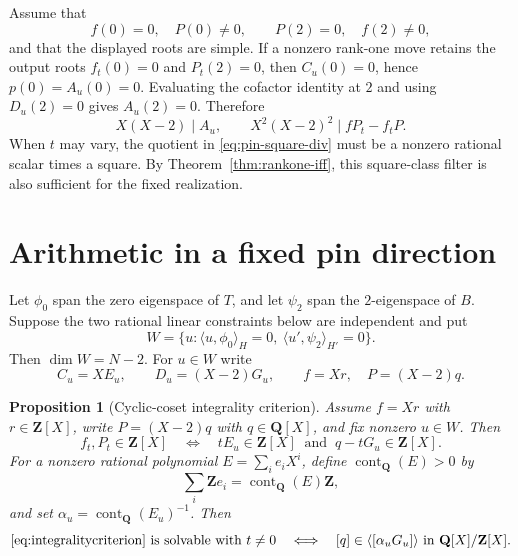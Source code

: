\documentclass[11pt,reqno]{amsart}
\newtheorem{proposition}[theorem]{Proposition}
\theoremstyle{definition}
\theoremstyle{remark}
\DeclareMathOperator{\cont}{cont}
\newcommand{\Q}{\mathbf Q}
\newcommand{\Z}{\mathbf Z}
\begin{document}
Assume that
\begin{equation}\label{eq:pins}
 f(0)=0,\quad P(0)\ne0,\qquad P(2)=0,\quad f(2)\ne0,
\end{equation}
and that the displayed roots are simple.  If a nonzero rank-one move retains
the output roots $f_t(0)=0$ and $P_t(2)=0$, then
$C_u(0)=0$, hence $p(0)=A_u(0)=0$.  Evaluating the cofactor identity at $2$
and using $D_u(2)=0$ gives $A_u(2)=0$.  Therefore
\begin{equation}\label{eq:pin-square-div}
 X(X-2)\mid A_u,\qquad
 X^2(X-2)^2\mid fP_t-f_tP.
\end{equation}
When $t$ may vary, the quotient in \eqref{eq:pin-square-div} must be a
nonzero rational scalar times a square.  By Theorem~\ref{thm:rankone-iff},
this square-class filter is also sufficient for the fixed realization.

\section{Arithmetic in a fixed pin direction}

Let $\phi_0$ span the zero eigenspace of $T$, and let $\psi_2$ span the
$2$-eigenspace of $B$.  Suppose the two rational linear constraints below are
independent and put
\begin{equation}\label{eq:pinspace}
 W=\{u:\langle u,\phi_0\rangle_H=0,
           \ \langle u',\psi_2\rangle_{H'}=0\}.
\end{equation}
Then $\dim W=N-2$.  For $u\in W$ write
\begin{equation}\label{eq:EG}
 C_u=XE_u,\qquad D_u=(X-2)G_u,\qquad
 f=Xr,\quad P=(X-2)q.
\end{equation}

\begin{proposition}[Cyclic-coset integrality criterion]\label{prop:cycliccoset}
Assume $f=Xr$ with $r\in\Z[X]$, write
$P=(X-2)q$ with $q\in\Q[X]$, and fix nonzero $u\in W$.  Then
\begin{equation}\label{eq:integralitycriterion}
 f_t,P_t\in\Z[X]\quad\Longleftrightarrow\quad
 tE_u\in\Z[X]\ \text{ and }\ q-tG_u\in\Z[X].
\end{equation}
For a nonzero rational polynomial $E=\sum_i e_iX^i$, define
$\cont_{\Q}(E)>0$ by
\[
 \sum_i\Z e_i=\cont_{\Q}(E)\Z,
\]
and set
$\alpha_u=\cont_{\Q}(E_u)^{-1}$.  Then
\begin{equation}\label{eq:cycliccoset}
 \text{\eqref{eq:integralitycriterion} is solvable with $t\ne0$}
 \quad\Longleftrightarrow\quad
 [q]\in\langle[\alpha_uG_u]\rangle
 \ \text{in }\Q[X]/\Z[X].
\end{equation}
\end{proposition}
\end{document}
